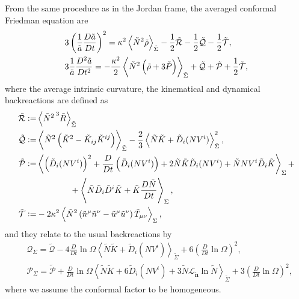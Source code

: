 From the same procedure as in the Jordan frame, the averaged conformal Friedman equation are
\begin{align}
    &3\left(\frac{1}{\Tilde{a}}\frac{D\Tilde{a}}{Dt}\right)^2 = \kappa^2\left\langle \Tilde{N}^2\Tilde{\rho}\right\rangle_{\Tilde{\Sigma}}-\frac{1}{2}\Tilde{\mathcal{R}}-\frac{1}{2}\Tilde{\mathcal{Q}}-\frac{1}{2}\Tilde{\mathcal{T}},\\
    &3\frac{1}{\Tilde{a}}\frac{D^2\Tilde{a}}{Dt^2}=-\frac{\kappa^2}{2}\left\langle \Tilde{N}^2\left(\Tilde{\rho}+3\Tilde{P}\right)\right\rangle_{\Tilde{\Sigma}}+\Tilde{\mathcal{Q}}+\Tilde{\mathcal{P}}+\frac{1}{2}\Tilde{\mathcal{T}},
\end{align}
where the average intrinsic curvature, the kinematical and dynamical backreactions are defined as
\begin{align}
    \tilde{\mathcal{R}}:=& \left\langle \tilde{N}^2\prescript{3}{}{\tilde{R}}\right\rangle_{\tilde{\Sigma}}\\
    \tilde{\mathcal{Q}}:=& \left\langle \tilde{N}^2\left(\tilde{K}^2-\tilde{K}_{ij}\tilde{K}^{ij}\right)\right\rangle_{\tilde{\Sigma}}-\frac{2}{3}\left\langle \tilde{N}\tilde{K}+\tilde{D}_i(NV^i)\right\rangle_{\tilde{\Sigma}}^2, \\
    \tilde{\mathcal{P}}:=& \left\langle \left(\tilde{D}_i(NV^i)\right)^2 + \frac{D}{Dt}\left(\tilde{D}_i(NV^i)\right)+2\tilde{N}\tilde{K}\tilde{D}_i(NV^i)+\tilde{N}NV^i\tilde{D}_i \tilde{K}\right\rangle_\Sigma+ \\
    &\qquad\qquad+ \left\langle \tilde{N} \tilde{D}_i \tilde{D}^i \tilde{K}+\tilde{K}\frac{D\tilde{N}}{Dt}\right\rangle_{\Sigma},\\
    \tilde{\mathcal{T}}:=&-2\kappa^2\left\langle \tilde{N}^2\left(\tilde{n}^\mu \tilde{n}^\nu-\tilde{u}^\mu \tilde{u}^\nu\right)\tilde{T}_{\mu\nu}\right\rangle_\Sigma,
\end{align}
and they relate to the usual backreactions by
\begin{align}
    &\mathcal{Q}_\Sigma = \tilde{\mathcal{Q}} - 4 \frac{D}{Dt}\ln\Omega\left\langle  \tilde{N}\tilde{K}+\tilde{D}_i(NV^i)\right\rangle_{\tilde{\Sigma}}+6\left(\frac{D}{Dt}\ln\Omega\right)^2,\\
    &\mathcal{P}_\Sigma = \tilde{\mathcal{P}}+\frac{D}{Dt}\ln\Omega\left\langle \tilde{N}\tilde{K}+6\tilde{D}_i(NV^i)+3\tilde{N}\mathcal{L}_{\mathbf{\tilde{n}}}\ln\tilde{N}\right\rangle_{\tilde{\Sigma}}+3\left(\frac{D}{Dt}\ln\Omega\right)^2,
\end{align}
where we assume the conformal factor to be homogeneous.

